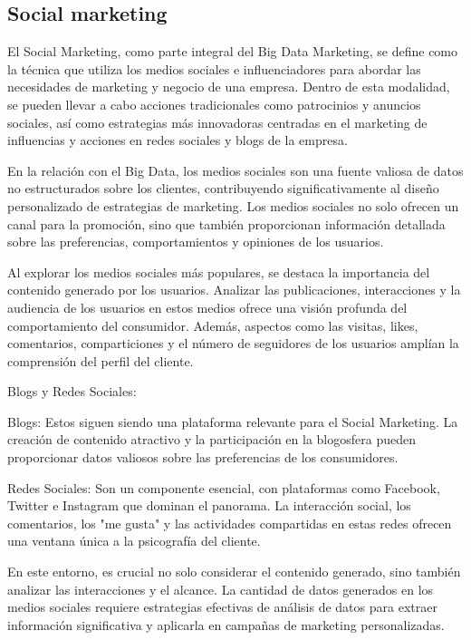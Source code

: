 \documentclass[
    a4paper, %
    10pt, %
    unnumberedsections, %
    twoside, %
]{LTJournalArticle}
\begin{document}
\subsection{Social marketing}

El Social Marketing, como parte integral del Big Data Marketing, se define como la técnica que utiliza los medios sociales e influenciadores para abordar las necesidades de marketing y negocio de una empresa. Dentro de esta modalidad, se pueden llevar a cabo acciones tradicionales como patrocinios y anuncios sociales, así como estrategias más innovadoras centradas en el marketing de influencias y acciones en redes sociales y blogs de la empresa.

En la relación con el Big Data, los medios sociales son una fuente valiosa de datos no estructurados sobre los clientes, contribuyendo significativamente al diseño personalizado de estrategias de marketing. Los medios sociales no solo ofrecen un canal para la promoción, sino que también proporcionan información detallada sobre las preferencias, comportamientos y opiniones de los usuarios.

Al explorar los medios sociales más populares, se destaca la importancia del contenido generado por los usuarios. Analizar las publicaciones, interacciones y la audiencia de los usuarios en estos medios ofrece una visión profunda del comportamiento del consumidor. Además, aspectos como las visitas, likes, comentarios, comparticiones y el número de seguidores de los usuarios amplían la comprensión del perfil del cliente.

Blogs y Redes Sociales:

Blogs: Estos siguen siendo una plataforma relevante para el Social Marketing. La creación de contenido atractivo y la participación en la blogosfera pueden proporcionar datos valiosos sobre las preferencias de los consumidores.

Redes Sociales: Son un componente esencial, con plataformas como Facebook, Twitter e Instagram que dominan el panorama. La interacción social, los comentarios, los "me gusta" y las actividades compartidas en estas redes ofrecen una ventana única a la psicografía del cliente.

En este entorno, es crucial no solo considerar el contenido generado, sino también analizar las interacciones y el alcance. La cantidad de datos generados en los medios sociales requiere estrategias efectivas de análisis de datos para extraer información significativa y aplicarla en campañas de marketing personalizadas.
\end{document}
